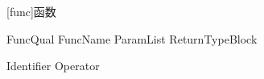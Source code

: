 
[func]{函数}

\begin{bnf}
 \br
    FuncQual\bnfs {} FuncName ParamList ReturnType\bnfq Block
\end{bnf}

\begin{bnf}
 \br
    Identifier \br
     \br
     Operator
\end{bnf}